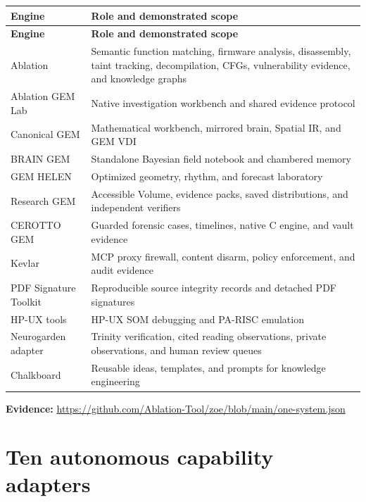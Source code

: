 \documentclass[11pt]{article}
\newcommand{\evidence}[1]{\par\smallskip\small\color{ZoeGray}\textbf{Evidence:} #1\normalsize\par\smallskip}
\begin{document}
\begin{longtable}{p{}p{}}
\toprule
\textbf{Engine} & \textbf{Role and demonstrated scope}\\
\midrule
\endfirsthead
\toprule
\textbf{Engine} & \textbf{Role and demonstrated scope}\\
\midrule
\endhead
Ablation & Semantic function matching, firmware analysis, disassembly, taint tracking, decompilation, CFGs, vulnerability evidence, and knowledge graphs\\
Ablation GEM Lab & Native investigation workbench and shared evidence protocol\\
Canonical GEM & Mathematical workbench, mirrored brain, Spatial IR, and GEM VDI\\
BRAIN GEM & Standalone Bayesian field notebook and chambered memory\\
GEM HELEN & Optimized geometry, rhythm, and forecast laboratory\\
Research GEM & Accessible Volume, evidence packs, saved distributions, and independent verifiers\\
CEROTTO GEM & Guarded forensic cases, timelines, native C engine, and vault evidence\\
Kevlar & MCP proxy firewall, content disarm, policy enforcement, and audit evidence\\
PDF Signature Toolkit & Reproducible source integrity records and detached PDF signatures\\
HP-UX tools & HP-UX SOM debugging and PA-RISC emulation\\
Neurogarden adapter & Trinity verification, cited reading observations, private observations, and human review queues\\
Chalkboard & Reusable ideas, templates, and prompts for knowledge engineering\\
\bottomrule
\end{longtable}

\evidence{\url{https://github.com/Ablation-Tool/zoe/blob/main/one-system.json}}

\clearpage
\section{Ten autonomous capability adapters}
\end{document}
